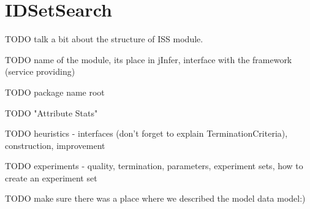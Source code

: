 \chapter{IDSetSearch}
\label{appendix-iss}

TODO talk a bit about the structure of ISS module.

TODO name of the module, its place in jInfer, interface with the framework (service providing)

TODO package name root

TODO "Attribute Stats"

TODO heuristics - interfaces (don't forget to explain TerminationCriteria), construction, improvement

TODO experiments - quality, termination, parameters, experiment sets, how to create an experiment set

TODO make sure there was a place where we described the model data model:)